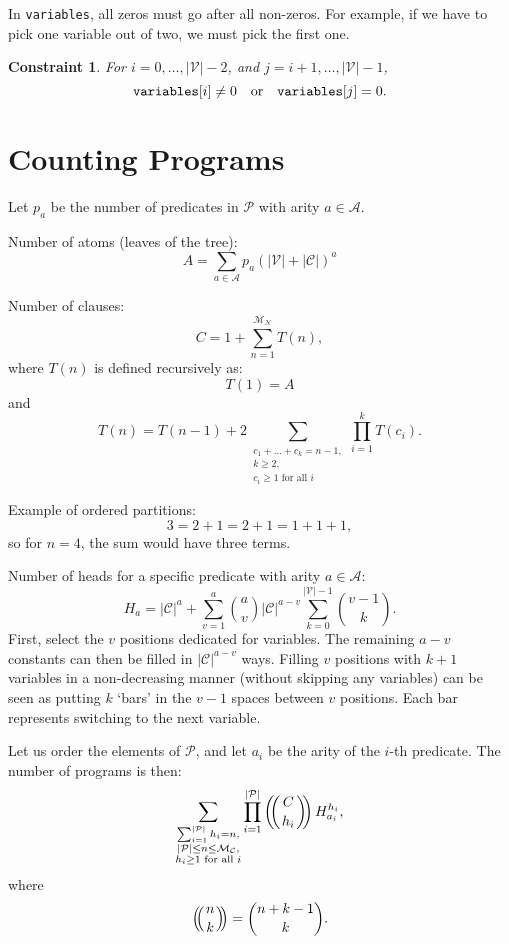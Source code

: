 \documentclass[runningheads]{llncs}
\newtheorem{constraint}{Constraint}
\newcommand{\variable}[1]{\texttt{\textup{#1}}}
\newcommand{\predicates}{\mathcal{P}}
\newcommand{\variables}{\mathcal{V}}
\newcommand{\constants}{\mathcal{C}}
\newcommand{\arities}{\mathcal{A}}
\newcommand{\maxNumNodes}{\mathcal{M}_{\mathcal{N}}}
\newcommand{\maxNumClauses}{\mathcal{M}_{\mathcal{C}}}
\def\multiset#1#2{\ensuremath{\left(\kern-.3em\left(\genfrac{}{}{0pt}{}{#1}{#2}\right)\kern-.3em\right)}}
\begin{document}
In \variable{variables}, all zeros must go after all non-zeros. For example,
if we have to pick one variable out of two, we must pick the first one.
\begin{constraint}
  For $i = 0, \dots, |\variables{}| - 2$, and $j = i + 1, \dots,
  |\variables{}| - 1$,
  \[
    \variable{variables}[i] \ne 0 \quad \text{or} \quad \variable{variables}[j]
    = 0.
  \]
\end{constraint}

\section{Counting Programs}

Let $p_a$ be the number of predicates in $\predicates{}$ with arity $a \in
\arities{}$.

Number of atoms (leaves of the tree):
\[
  A = \sum_{a \in \arities{}} p_a(|\variables{}| + |\constants{}|)^a
\]

Number of clauses:
\[
  C = 1 + \sum_{n=1}^{\maxNumNodes{}} T(n),
\]
where $T(n)$ is defined recursively as:
\[
  T(1) = A
\]
and
\[
  T(n) = T(n-1) + 2\sum_{\substack{c_1 + \dots + c_k = n - 1,\\
      k \ge 2,\\
      c_i \ge 1 \text{ for all } i}} \prod_{i=1}^k T(c_i).
\]

Example of ordered partitions:
\[
  3 = 2 + 1 = 2 + 1 = 1 + 1 + 1,
\]
so for $n=4$, the sum would have three terms.

Number of heads for a specific predicate with arity $a \in \arities{}$:
\[
  H_a = |\constants{}|^a + \sum_{v=1}^a \binom{a}{v} |\constants{}|^{a-v}
  \sum_{k=0}^{|\variables{}|-1} \binom{v-1}{k}.
\]
First, select the $v$ positions dedicated for variables. The remaining $a-v$
constants can then be filled in $|\constants{}|^{a-v}$ ways. Filling $v$
positions with $k+1$ variables in a non-decreasing manner (without skipping any
variables) can be seen as putting $k$ `bars' in the $v-1$ spaces between $v$
positions. Each bar represents switching to the next variable.

Let us order the elements of $\predicates{}$, and let $a_i$ be the arity of the
$i$-th predicate. The number of programs is then:
\[
  \sum_{\substack{ \sum_{i=1}^{|\predicates{}|} h_i = n,\\
      |\predicates{}| \le n \le \maxNumClauses,\\
      h_i \ge 1 \text{ for all } i}} \prod_{i=1}^{|\predicates{}|}
  \multiset{C}{h_i} H_{a_i}^{h_i},
\]
where
\[
  \multiset{n}{k} = \binom{n + k - 1}{k}.
\]
\end{document}
